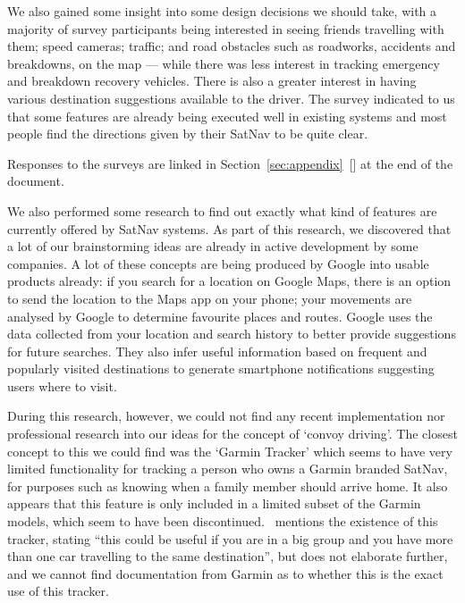 \documentclass{article}
\begin{document}
We also gained some insight into some design decisions we should take, with a majority of survey participants being interested in seeing friends travelling with them; speed cameras; traffic; and road obstacles such as roadworks, accidents and breakdowns, on the map --- while there was less interest in tracking emergency and breakdown recovery vehicles. There is also a greater interest in having various destination suggestions available to the driver. The survey indicated to us that some features are already being executed well in existing systems and most people find the directions given by their SatNav to be quite clear.

Responses to the surveys are linked in Section~\ref{sec:appendix}~[] at the end of the document.

We also performed some research to find out exactly what kind of features are currently offered by SatNav systems. As part of this research, we discovered that a lot of our brainstorming ideas are already in active development by some companies. A lot of these concepts are being produced by Google into usable products already: if you search for a location on Google Maps, there is an option to send the location to the Maps app on your phone; your movements are analysed by Google to determine favourite places and routes. Google uses the data collected from your location and search history to better provide suggestions for future searches. They also infer useful information based on frequent and popularly visited destinations to generate smartphone notifications suggesting users where to visit.  

During this research, however, we could not find any recent implementation nor professional research into our ideas for the concept of `convoy driving'. The closest concept to this we could find was the `Garmin Tracker' which seems to have very limited functionality for tracking a person who owns a Garmin branded SatNav, for purposes such as knowing when a family member should arrive home. It also appears that this feature is only included in a limited subset of the Garmin models, which seem to have been discontinued. \textcite{garmin-tracker}~mentions the existence of this tracker, stating ``this could be useful if you are in a big group and you have more than one car travelling to the same destination'', but does not elaborate further, and we cannot find documentation from Garmin as to whether this is the exact use of this tracker.
\end{document}
